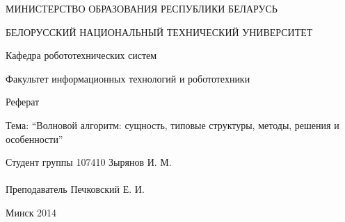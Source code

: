\begin{titlepage} %

\thispagestyle{empty} %

\begin{center}
МИНИСТЕРСТВО ОБРАЗОВАНИЯ РЕСПУБЛИКИ БЕЛАРУСЬ

БЕЛОРУССКИЙ НАЦИОНАЛЬНЫЙ ТЕХНИЧЕСКИЙ УНИВЕРСИТЕТ

Кафедра робототехнических систем

Факультет информационных технологий и робототехники
\end{center}

\vfill

\begin{center}
    \Large{Реферат}

    \large{Тема: ``Волновой алгоритм: сущность, типовые структуры, методы, решения и особенности''}
\end{center}

\vfill

\noindent
Студент группы 107410 \hfill Зырянов И. М.
\\
\\
\noindent
Преподаватель \hfill Печковский Е. И.

\vfill

\centerline{Минск 2014}

\clearpage %

\end{titlepage}

\setcounter{page}{2}
